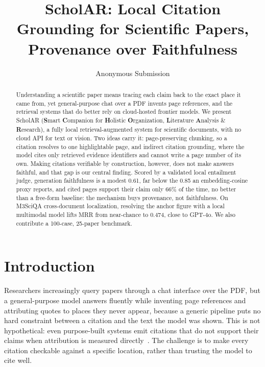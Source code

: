 \documentclass[letterpaper]{article} %
\title{ScholAR: Local Citation Grounding for Scientific Papers,\\Provenance over Faithfulness}
\author{
    Anonymous Submission
}
\begin{document}
\maketitle

\begin{abstract}
Understanding a scientific paper means tracing each claim back to the exact place it came from, yet
general-purpose chat over a PDF invents page references, and the retrieval systems that do better
rely on cloud-hosted frontier models. We present ScholAR (\textbf{S}mart \textbf{C}ompanion for
\textbf{H}olistic \textbf{O}rganization, \textbf{L}iterature \textbf{A}nalysis \& \textbf{R}esearch),
a fully local retrieval-augmented system for scientific documents, with no cloud API for text or
vision. Two ideas carry it: page-preserving chunking, so a citation resolves to one highlightable
page, and indirect citation grounding, where the model cites only retrieved evidence identifiers and
cannot write a page number of its own. Making citations verifiable by construction, however, does not
make answers faithful, and that gap is our central finding. Scored by a validated local entailment
judge, generation faithfulness is a modest 0.61, far below the 0.85 an embedding-cosine proxy
reports, and cited pages support their claim only 66\% of the time, no better than a free-form
baseline: the mechanism buys provenance, not faithfulness. On M3SciQA cross-document localization,
resolving the anchor figure with a local multimodal model lifts MRR from near-chance to 0.474, close
to GPT-4o. We also contribute a 100-case, 25-paper benchmark.
\end{abstract}

\section{Introduction}
Researchers increasingly query papers through a chat interface over the PDF, but a general-purpose
model answers fluently while inventing page references and attributing quotes to places they never
appear, because a generic pipeline puts no hard constraint between a citation and the text the model
was shown. This is not hypothetical: even purpose-built systems emit citations that do not support
their claims when attribution is measured directly~\citep{gao2023attributing}. The challenge is to
make every citation checkable against a specific location, rather than trusting the model to cite
well.
\end{document}

